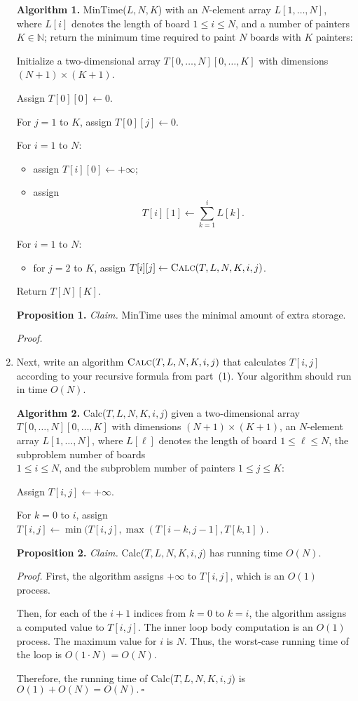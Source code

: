 \begin{enumerate}
\begin{solution}

\textbf{Algorithm 1. }{\sc MinTime}($L,N,K$) with an $N$-element array $L[1,\dots,N]$, where $L[i]$ denotes the length of board $1\leq i\leq N$, and a number of painters $K\in\mathbb{N}$; return the minimum time required to paint $N$ boards with $K$ painters:

Initialize a two-dimensional array $T[0,\dots,N][0,\dots,K]$ with dimensions $(N+1)\times(K+1)$.

Assign $T[0][0]\leftarrow 0$.

For $j=1$ to $K$, assign $T[0][j]\leftarrow 0$.

For $i=1$ to $N$:
\begin{itemize}
    \item assign $T[i][0]\leftarrow+\infty$;
    \item assign \[T[i][1]\leftarrow\sum_{k=1}^i{L[k]}.\]
\end{itemize}

For $i=1$ to $N$:
\begin{itemize}
    \item for $j=2$ to $K$, assign $T[i][j]\leftarrow\textsc{Calc}(T,L,N,K,i,j)$.
\end{itemize}
Return $T[N][K]$.

\textbf{Proposition 1. }\textit{Claim. }{\sc MinTime} uses the minimal amount of extra storage.

\textit{Proof. }
\end{solution}
\item Next, write an algorithm $\text{\sc Calc}(T,L,N,K,i,j)$ that calculates $T[i,j]$
according to your recursive formula from part~(1). Your algorithm should run in time $O(N)$.
\begin{solution}

\textbf{Algorithm 2. }{\sc Calc}($T,L,N,K,i,j$) given a two-dimensional array\\ $T[0,\dots,N][0,\dots,K]$ with dimensions  $(N+1)\times (K+1)$, an $N$-element array $L[1,\dots,N]$, where $L[\ell]$ denotes the length of board $1\leq\ell\leq N$, the subproblem number of boards\\ $1\leq i\leq N$, and the subproblem number of painters $1\leq j\leq K$:

Assign $T[i,j]\leftarrow+\infty$.

For $k=0$ to $i$, assign $T[i,j]\leftarrow\min(T[i,j],\max(T[i-k,j-1],T[k,1])$.

\textbf{Proposition 2. }\textit{Claim. }{\sc Calc}($T,L,N,K,i,j$) has running time $O(N)$.

\textit{Proof. }First, the algorithm assigns $+\infty$ to $T[i,j]$, which is an $O(1)$ process.

Then, for each of the $i+1$ indices from $k=0$ to $k=i$, the algorithm assigns a computed value to $T[i,j]$. The inner loop body computation is an $O(1)$ process. The maximum value for $i$ is $N$. Thus, the worst-case running time of the loop is $O(1\cdot N)=O(N)$.

Therefore, the running time of {\sc Calc}($T,L,N,K,i,j$) is $O(1)+O(N)=O(N).~\square$
\end{solution}
\end{enumerate}